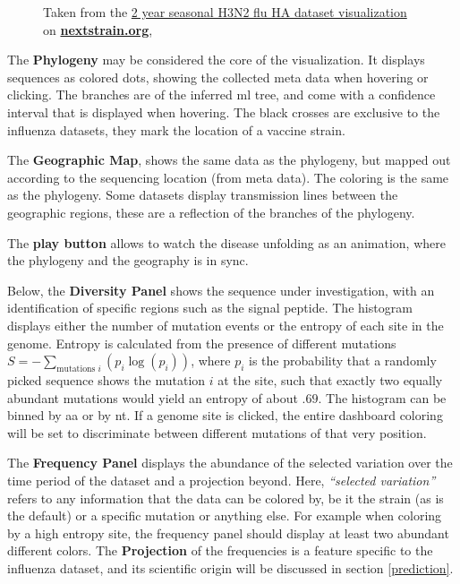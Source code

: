 \documentclass[12pt]{scrartcl}
\begin{document}
  \begin{figure}[h!]
    \caption{\footnotesize Taken from the \href{https://nextstrain.org/flu/seasonal/h3n2/ha/2y?p=grid}{2 year seasonal H3N2 flu HA dataset visualization} on \href{https://nextstrain.org}{\textbf{nextstrain.org}}, \cite{leeMoncla+20}}
  \end{figure}
  
  The \textbf{Phylogeny} may be considered the core of the visualization. It displays sequences as colored dots, showing the collected meta data when hovering or clicking. The branches are of the inferred \acrshort{ml} tree, and come with a confidence interval that is displayed when hovering. The black crosses are exclusive to the influenza datasets, they mark the location of a vaccine strain.

  The \textbf{Geographic Map}, shows the same data as the phylogeny, but mapped out according to the sequencing location (from meta data). The coloring is the same as the phylogeny. Some datasets display transmission lines between the geographic regions, these are a reflection of the branches of the phylogeny.

  The \textbf{play button} allows to watch the disease unfolding as an animation, where the phylogeny and the geography is in sync.

  Below, the \textbf{Diversity Panel} shows the sequence under investigation, with an identification of specific regions such as the signal peptide. The histogram displays either the number of mutation events or the entropy of each site in the genome. Entropy is calculated from the presence of different mutations $ S = -\sum_{\text{mutations } i}(p_i \log(p_i))$, where $p_i$ is the probability that a randomly picked sequence shows the mutation $i$ at the site, such that exactly two equally abundant mutations would yield an entropy of about $.69$. The histogram can be binned by \acrfull{aa} or by \acrfull{nt}. If a genome site is clicked, the entire dashboard coloring will be set to discriminate between different mutations of that very position.

  The \textbf{Frequency Panel} displays the abundance of the selected variation over the time period of the dataset and a projection beyond. Here, \textit{``selected variation''} refers to any information that the data can be colored by, be it the strain (as is the default) or a specific mutation or anything else. For example when coloring by a high entropy site, the frequency panel should display at least two abundant different colors. The \textbf{Projection} of the frequencies is a feature specific to the influenza dataset, and its scientific origin will be discussed in section \ref{prediction}.
\end{document}
